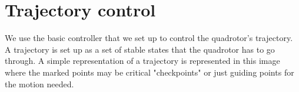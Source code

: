 \documentclass[hidelinks,BTech]{iitmdiss}
\begin{document}
%
%
%
%

\chapter{Trajectory control}
We use the basic controller that we set up to control the quadrotor's trajectory. A trajectory is set up as a set of stable states that the quadrotor has to go through. A simple representation of a trajectory is represented in this image where the marked points may be critical "checkpoints" or just guiding points for the motion needed.
\end{document}
